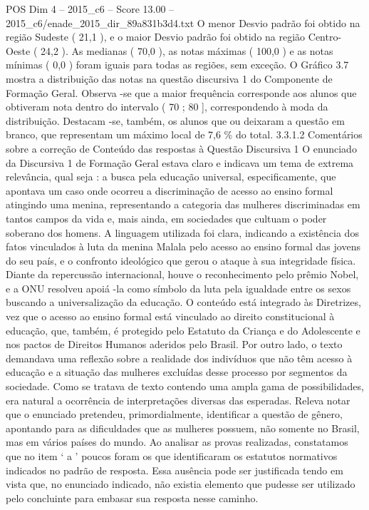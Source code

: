 \begin{textsample}{POS Dim 4 – 2015\_c6 – Score 13.00 – 2015\_c6/enade\_2015\_dir\_89a831b3d4.txt}
O menor Desvio padrão foi obtido na região Sudeste ( 21,1 ), e o maior Desvio padrão foi obtido na região Centro-Oeste ( 24,2 ).
As medianas ( 70,0 ), as notas máximas ( 100,0 ) e as notas mínimas ( 0,0 ) foram iguais para todas as regiões, sem exceção.
O Gráfico 3.7 mostra a distribuição das notas na questão discursiva 1 do Componente de Formação Geral.
Observa -se que a maior frequência corresponde aos alunos que obtiveram nota dentro do intervalo ( 70 ; 80 ], correspondendo à moda da distribuição.
Destacam -se, também, os alunos que ou deixaram a questão em branco, que representam um máximo local de 7,6 \% do total. 3.3.1.2 Comentários sobre a correção de Conteúdo das respostas à Questão Discursiva 1 O enunciado da Discursiva 1 de Formação Geral estava claro e indicava um tema de extrema relevância, qual seja : a busca pela educação universal, especificamente, que apontava um caso onde ocorreu a discriminação de acesso ao ensino formal atingindo uma menina, representando a categoria das mulheres discriminadas em tantos campos da vida e, mais ainda, em sociedades que cultuam o poder soberano dos homens.
A linguagem utilizada foi clara, indicando a existência dos fatos vinculados à luta da menina Malala pelo acesso ao ensino formal das jovens do seu país, e o confronto ideológico que gerou o ataque à sua integridade física.
Diante da repercussão internacional, houve o reconhecimento pelo prêmio Nobel, e a ONU resolveu apoiá -la como símbolo da luta pela igualdade entre os sexos buscando a universalização da educação.
O conteúdo está integrado às Diretrizes, vez que o acesso ao ensino formal está vinculado ao direito constitucional à educação, que, também, é protegido pelo Estatuto da Criança e do Adolescente e nos pactos de Direitos Humanos aderidos pelo Brasil.
Por outro lado, o texto demandava uma reflexão sobre a realidade dos indivíduos que não têm acesso à educação e a situação das mulheres excluídas desse processo por segmentos da sociedade.
Como se tratava de texto contendo uma ampla gama de possibilidades, era natural a ocorrência de interpretações diversas das esperadas.
Releva notar que o enunciado pretendeu, primordialmente, identificar a questão de gênero, apontando para as dificuldades que as mulheres possuem, não somente no Brasil, mas em vários países do mundo.
Ao analisar as provas realizadas, constatamos que no item ‘ a ’ poucos foram os que identificaram os estatutos normativos indicados no padrão de resposta.
Essa ausência pode ser justificada tendo em vista que, no enunciado indicado, não existia elemento que pudesse ser utilizado pelo concluinte para embasar sua resposta nesse caminho.

\end{textsample}
